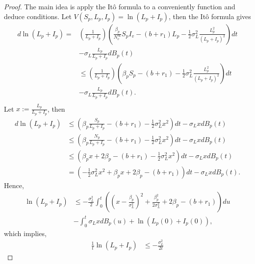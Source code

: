 \begin{proof}
	The main idea is apply the It\^{o} formula to a conveniently function and 
	deduce conditions. Let 
	$
		V(S_p, L_p, I_p) = \ln(L_p + I_p)
	$, then the It\^{o} formula gives
	\begin{align*}
		d \ln(L_p+I_p) 
			=&
				\left(
					\frac{1}{L_p + I_p}
				\right)
				\left(
					\frac{\beta_p}{N_v^\infty} 
					S_p I_v - (b + r_1) L_p
					-\frac{1}{2}
					\sigma_L^2 \frac{L_p^2}{(L_p+I_p)^2}
				\right)dt
			\\
			&-
				\sigma_L \frac{L_p}{L_p+I_p}dB_p(t)\\
			&\leq 
				\left(
					\frac{1}{L_p+I_p}
				\right)
				\left(
					\beta_p S_p - (b + r_1) -
					\frac{1}{2}
					\sigma_L^2
					\frac{L_p^2}{(L_p+I_p)^2}
				\right)dt
			\\
			&-
				\sigma_L \frac{L_p}{L_p + I_p} dB_p(t).
			\\
	\end{align*}
	Let $x:=\frac{L_p}{L_p + I_p}$, then
		\begin{align*}
		d \ln(L_p + I_p) 
			&\leq 
				\left(
					\beta_p 
					\frac{S_p}{L_p + I_p} - 
					(b + r_1) - 
					\frac{1}{2}
					\sigma_L ^ 2 x^2
				\right)dt - \sigma_L x dB_p(t)
			\\
			&\leq
				\left(\beta_p
					\frac{N_p}{L_p + I_p} - (b+r_1) - 
					\frac{1}{2} 
					\sigma_L^2 x^2
				\right) dt - 
				\sigma_L xdB_p(t)
			\\
			&\leq
				\left(
					\beta_p x + 2\beta_p - 
					(b + r_1) - 
					\frac{1}{2}
					\sigma_L ^ 2 x^2
				\right) dt - 
				\sigma_L xdB_p(t)
			\\
			&=
				\left(
					-\frac{1}{2}
					\sigma_L ^ 2 x ^ 2 + 
					\beta_p x + 2 \beta_p - 
					(b + r_1)
				\right) dt -\sigma_L x 
				dB_p(t).			
	\end{align*}
	Hence,
	\begin{align*}
		\ln(L_p+I_p)
			&\leq
				-\frac{\sigma_L ^ 2}{2}
				\int_{0} ^ {t}
					\left(
						\left(
							x - 
							\frac{\beta_p}{\sigma_L ^ 2}
						\right) ^ 2 + 
						\frac{\beta_p ^ 2}{2 \sigma_L ^ 2} + 
						2 \beta_p - (b + r_1)
					\right) du
				\\
			&-
				\int_{0} ^ {t}
					\sigma_L x dB_p(u) + 
					\ln(L_p(0) + I_p(0)),
	\end{align*}
	which implies,
	\begin{equation}
	\label{eq4.1}
		\begin{aligned}
			\frac{1}{t}\ln(L_p+I_p) 
				&\leq
					-\frac{\sigma_L^2}{2t}

\end{aligned}
\end{equation}
\end{proof}
